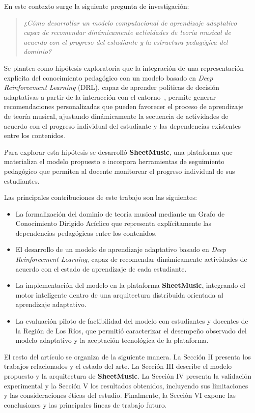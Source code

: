 En este contexto surge la siguiente pregunta de investigación:

\begin{quote}
\textit{¿Cómo desarrollar un modelo computacional de aprendizaje adaptativo capaz de recomendar dinámicamente actividades de teoría musical de acuerdo con el progreso del estudiante y la estructura pedagógica del dominio?}
\end{quote}

Se plantea como hipótesis exploratoria que la integración de una representación explícita del conocimiento pedagógico con un modelo basado en \textit{Deep Reinforcement Learning} (DRL), capaz de aprender políticas de decisión adaptativas a partir de la interacción con el entorno~\cite{sutton2018reinforcement,mnih2015dqn}, permite generar recomendaciones personalizadas que pueden favorecer el proceso de aprendizaje de teoría musical, ajustando dinámicamente la secuencia de actividades de acuerdo con el progreso individual del estudiante y las dependencias existentes entre los contenidos.

Para explorar esta hipótesis se desarrolló \textbf{SheetMusic}, una plataforma que materializa el modelo propuesto e incorpora herramientas de seguimiento pedagógico que permiten al docente monitorear el progreso individual de sus estudiantes.

Las principales contribuciones de este trabajo son las siguientes:

\begin{itemize}
\item La formalización del dominio de teoría musical mediante un Grafo de Conocimiento Dirigido Acíclico que representa explícitamente las dependencias pedagógicas entre los contenidos.

\item El desarrollo de un modelo de aprendizaje adaptativo basado en \textit{Deep Reinforcement Learning}, capaz de recomendar dinámicamente actividades de acuerdo con el estado de aprendizaje de cada estudiante.

\item La implementación del modelo en la plataforma \textbf{SheetMusic}, integrando el motor inteligente dentro de una arquitectura distribuida orientada al aprendizaje adaptativo.

\item La evaluación piloto de factibilidad del modelo con estudiantes y docentes de la Región de Los Ríos, que permitió caracterizar el desempeño observado del modelo adaptativo y la aceptación tecnológica de la plataforma.
\end{itemize}

El resto del artículo se organiza de la siguiente manera. La Sección II presenta los trabajos relacionados y el estado del arte. La Sección III describe el modelo propuesto y la arquitectura de \textbf{SheetMusic}. La Sección IV presenta la validación experimental y la Sección V los resultados obtenidos, incluyendo sus limitaciones y las consideraciones éticas del estudio. Finalmente, la Sección VI expone las conclusiones y las principales líneas de trabajo futuro.